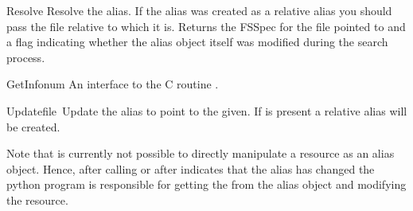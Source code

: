 \begin{funcdesc}{Resolve}{}
Resolve the alias. If the alias was created as a relative alias you
should pass the file relative to which it is. Returns the FSSpec for
the file pointed to and a flag indicating whether the alias object
itself was modified during the search process. 
\end{funcdesc}

\begin{funcdesc}{GetInfo}{num}
An interface to the C routine .
\end{funcdesc}

\begin{funcdesc}{Update}{file\, }
Update the alias to point to the  given. If  is
present a relative alias will be created.
\end{funcdesc}

Note that is currently not possible to directly manipulate a resource
as an alias object. Hence, after calling  or after
 indicates that the alias has changed the python program
is responsible for getting the  from the alias object and
modifying the resource.


